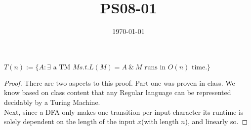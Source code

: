 \documentclass{article}
\title{PS08-01}
\date{\today}
\begin{document}
\maketitle
$T(n) := \{A : \exists \text{ a TM } M s.t. L(M) = A\ \&\ M \text{ runs in } O(n)\text{ time.}\}$
\begin{proof}
There are two aspects to this proof. Part one was proven in class. We know based on class content that any Regular language can be represented decidably by a Turing Machine.\\
Next, since a DFA only makes one transition per input character its runtime is solely dependent on the length of the input $x$(with length $n$), and linearly so. 
\end{proof}
\end{document}
